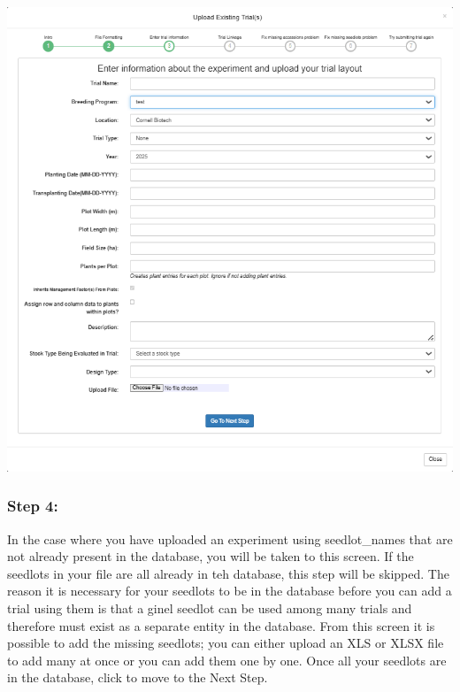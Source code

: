 \documentclass[
  12pt,
]{book}
\begin{document}
\begin{center}\includegraphics[width=0.95\linewidth]{assets/images/manage_trials_upload_trial_3} \end{center}

\hypertarget{step-4}{%
\subsubsection*{Step 4:}\label{step-4}}


In the case where you have uploaded an experiment using seedlot\_names that are not already present in the database, you will be taken to this screen. If the seedlots in your file are all already in teh database, this step will be skipped. The reason it is necessary for your seedlots to be in the database before you can add a trial using them is that a ginel seedlot can be used among many trials and therefore must exist as a separate entity in the database. From this screen it is possible to add the missing seedlots; you can either upload an XLS or XLSX file to add many at once or you can add them one by one. Once all your seedlots are in the database, click to move to the Next Step.
\end{document}
